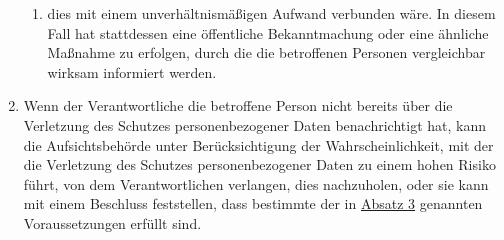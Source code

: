 \begin{enumerate}
\begin{enumerate}
    \item dies mit einem unverhältnismäßigen Aufwand verbunden wäre. In diesem Fall hat stattdessen eine öffentliche
     Bekanntmachung oder eine ähnliche Maßnahme zu erfolgen, durch die die betroffenen Personen vergleichbar wirksam
     informiert werden.
    \label{itm:34-3c}

  \end{enumerate}

  \item Wenn der Verantwortliche die betroffene Person nicht bereits über die Verletzung des Schutzes personenbezogener
   Daten benachrichtigt hat, kann die Aufsichtsbehörde unter Berücksichtigung der Wahrscheinlichkeit, mit der die
   Verletzung des Schutzes personenbezogener Daten zu einem hohen Risiko führt, von dem Verantwortlichen verlangen,
   dies nachzuholen, oder sie kann mit einem Beschluss feststellen, dass bestimmte der in \hyperref[itm:34-3]{Absatz 3}
   genannten Voraussetzungen erfüllt sind.
  \label{itm:34-4}

\end{enumerate}


